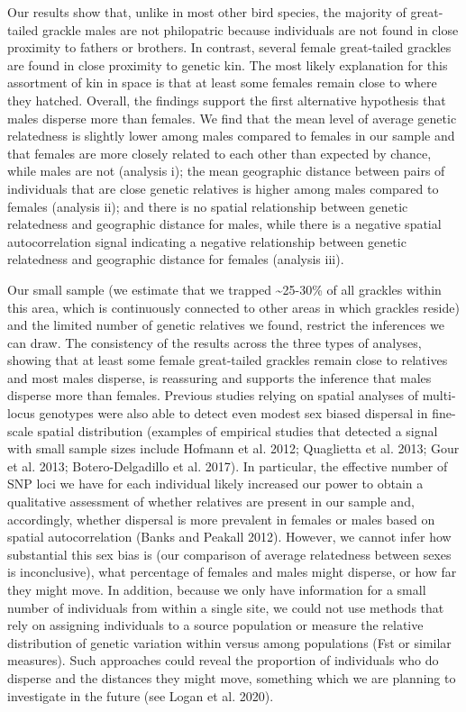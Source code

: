 \documentclass[]{article}
\begin{document}
Our results show that, unlike in most other bird species, the majority
of great-tailed grackle males are not philopatric because individuals
are not found in close proximity to fathers or brothers. In contrast,
several female great-tailed grackles are found in close proximity to
genetic kin. The most likely explanation for this assortment of kin in
space is that at least some females remain close to where they hatched.
Overall, the findings support the first alternative hypothesis that
males disperse more than females. We find that the mean level of average
genetic relatedness is slightly lower among males compared to females in
our sample and that females are more closely related to each other than
expected by chance, while males are not (analysis i); the mean
geographic distance between pairs of individuals that are close genetic
relatives is higher among males compared to females (analysis ii); and
there is no spatial relationship between genetic relatedness and
geographic distance for males, while there is a negative spatial
autocorrelation signal indicating a negative relationship between
genetic relatedness and geographic distance for females (analysis iii).

Our small sample (we estimate that we trapped \textasciitilde{}25-30\%
of all grackles within this area, which is continuously connected to
other areas in which grackles reside) and the limited number of genetic
relatives we found, restrict the inferences we can draw. The consistency
of the results across the three types of analyses, showing that at least
some female great-tailed grackles remain close to relatives and most
males disperse, is reassuring and supports the inference that males
disperse more than females. Previous studies relying on spatial analyses
of multi-locus genotypes were also able to detect even modest sex biased
dispersal in fine-scale spatial distribution (examples of empirical
studies that detected a signal with small sample sizes include Hofmann
et al. 2012; Quaglietta et al. 2013; Gour et al. 2013; Botero-Delgadillo
et al. 2017). In particular, the effective number of SNP loci we have
for each individual likely increased our power to obtain a qualitative
assessment of whether relatives are present in our sample and,
accordingly, whether dispersal is more prevalent in females or males
based on spatial autocorrelation (Banks and Peakall 2012). However, we
cannot infer how substantial this sex bias is (our comparison of average
relatedness between sexes is inconclusive), what percentage of females
and males might disperse, or how far they might move. In addition,
because we only have information for a small number of individuals from
within a single site, we could not use methods that rely on assigning
individuals to a source population or measure the relative distribution
of genetic variation within versus among populations (Fst or similar
measures). Such approaches could reveal the proportion of individuals
who do disperse and the distances they might move, something which we
are planning to investigate in the future (see Logan et al. 2020).
\end{document}

